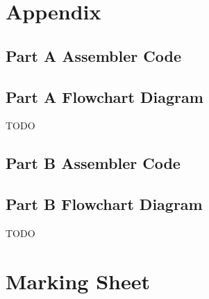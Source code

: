 \documentclass[letterpaper]{article}
\begin{document}
\newpage
\section{Appendix}
  \subsection{Part A Assembler Code}
    
\newpage
  \subsection{Part A Flowchart Diagram}
    TODO
\newpage
  \subsection{Part B Assembler Code}
    
\newpage
  \subsection{Part B Flowchart Diagram}
    TODO
\newpage

\section{Marking Sheet}
\end{document}
